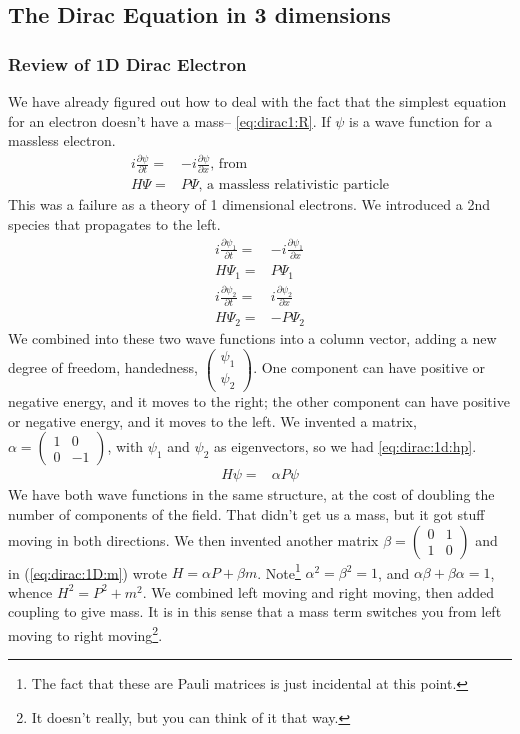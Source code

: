 \documentclass[]{article}
\begin{document}
\subsection{The Dirac Equation in 3 dimensions}

\subsubsection{Review of 1D Dirac Electron}

We have already figured out how to deal with the fact that the simplest equation for an electron doesn't have a mass-- \eqref{eq:dirac1:R}. If $\psi$ is a wave function for a massless electron.
\begin{align*}
	i \frac{\partial \psi}{\partial t}=& -i \frac{\partial \psi}{\partial x} \text{, from} \\
	H \Psi =& P \Psi \text{, a massless relativistic particle}
\end{align*}
This was a failure as a theory of 1 dimensional electrons. We introduced a 2nd species that propagates to the left.
\begin{align*}
	i \frac{\partial \psi_1}{\partial t}=& -i \frac{\partial \psi_1}{\partial x} \\
	H \Psi_1 =& P \Psi_1\\
	i \frac{\partial \psi_2}{\partial t}=& i \frac{\partial \psi_2}{\partial x} \\
	H \Psi_2 =& -P \Psi_2
\end{align*}
We combined into these two wave functions into a column vector, adding a new degree of freedom, handedness, $\begin{pmatrix} \psi_1\\ \psi_2 \end{pmatrix}$. One component can have positive or negative energy, and it moves to the right;  the other component can have positive or negative energy, and it moves to the left. We invented a matrix,  $\alpha = \begin{pmatrix}
1&0\\
0&-1
\end{pmatrix}$, with $\psi_1$ and $\psi_2$ as eigenvectors, so we had \eqref{eq:dirac:1d:hp}.
\begin{align*}
	H \psi =& \alpha P \psi
\end{align*}
We have both wave functions in the same structure, at the cost of doubling the number of components of the field. That didn't get us a mass, but it got stuff moving in both directions. We then invented another matrix $\beta=\begin{pmatrix}
0&1\\
1&0
\end{pmatrix}$ and in (\ref{eq:dirac:1D:m}) wrote $H = \alpha P + \beta m$. Note\footnote{The fact that these are Pauli matrices is just incidental at this point.} $\alpha^2=\beta^2=1$, and $\alpha\beta + \beta\alpha=1$, whence $H^2=P^2+m^2$. We combined left moving and right moving, then added coupling to give mass. It is in this sense that a mass term switches you from left moving to right moving\footnote{It doesn't really, but you can think of it that way.}.
\end{document}

